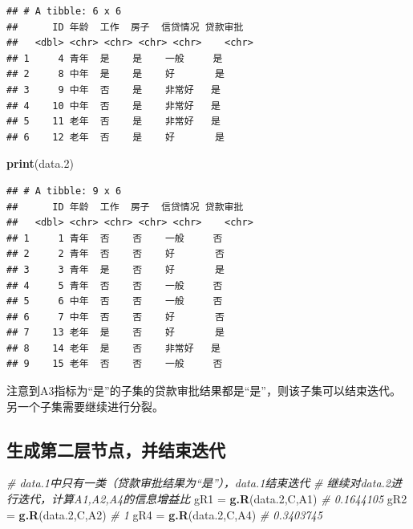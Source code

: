 \documentclass[
]{ctexart}
\newenvironment{Shaded}{\begin{snugshade}}{\end{snugshade}}
\newcommand{\CommentTok}[1]{\textcolor[rgb]{0.56,0.35,0.01}{\textit{#1}}}
\newcommand{\FloatTok}[1]{\textcolor[rgb]{0.00,0.00,0.81}{#1}}
\newcommand{\FunctionTok}[1]{\textcolor[rgb]{0.13,0.29,0.53}{\textbf{#1}}}
\newcommand{\NormalTok}[1]{#1}
\newcommand{\OtherTok}[1]{\textcolor[rgb]{0.56,0.35,0.01}{#1}}
\begin{document}
\begin{verbatim}
## # A tibble: 6 x 6
##      ID 年龄  工作  房子  信贷情况 贷款审批
##   <dbl> <chr> <chr> <chr> <chr>    <chr>   
## 1     4 青年  是    是    一般     是      
## 2     8 中年  是    是    好       是      
## 3     9 中年  否    是    非常好   是      
## 4    10 中年  否    是    非常好   是      
## 5    11 老年  否    是    非常好   是      
## 6    12 老年  否    是    好       是
\end{verbatim}

\begin{Shaded}
\begin{Highlighting}[]
\FunctionTok{print}\NormalTok{(data}\FloatTok{.2}\NormalTok{)}
\end{Highlighting}
\end{Shaded}

\begin{verbatim}
## # A tibble: 9 x 6
##      ID 年龄  工作  房子  信贷情况 贷款审批
##   <dbl> <chr> <chr> <chr> <chr>    <chr>   
## 1     1 青年  否    否    一般     否      
## 2     2 青年  否    否    好       否      
## 3     3 青年  是    否    好       是      
## 4     5 青年  否    否    一般     否      
## 5     6 中年  否    否    一般     否      
## 6     7 中年  否    否    好       否      
## 7    13 老年  是    否    好       是      
## 8    14 老年  是    否    非常好   是      
## 9    15 老年  否    否    一般     否
\end{verbatim}

注意到A3指标为``是''的子集的贷款审批结果都是``是''，则该子集可以结束迭代。另一个子集需要继续进行分裂。

\hypertarget{ux751fux6210ux7b2cux4e8cux5c42ux8282ux70b9ux5e76ux7ed3ux675fux8fedux4ee3}{%
\subsection{生成第二层节点，并结束迭代}\label{ux751fux6210ux7b2cux4e8cux5c42ux8282ux70b9ux5e76ux7ed3ux675fux8fedux4ee3}}

\begin{Shaded}
\begin{Highlighting}[]
\CommentTok{\# data.1中只有一类（贷款审批结果为“是”），data.1结束迭代}
\CommentTok{\# 继续对data.2进行迭代，计算A1,A2,A4的信息增益比}
\NormalTok{gR1 }\OtherTok{=} \FunctionTok{g.R}\NormalTok{(data}\FloatTok{.2}\NormalTok{,C,A1) }\CommentTok{\# 0.1644105}
\NormalTok{gR2 }\OtherTok{=} \FunctionTok{g.R}\NormalTok{(data}\FloatTok{.2}\NormalTok{,C,A2) }\CommentTok{\# 1}
\NormalTok{gR4 }\OtherTok{=} \FunctionTok{g.R}\NormalTok{(data}\FloatTok{.2}\NormalTok{,C,A4) }\CommentTok{\# 0.3403745}
\end{Highlighting}
\end{Shaded}
\end{document}
